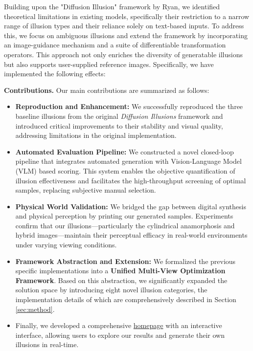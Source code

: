 \documentclass{article}
\begin{document}
Building upon the "Diffusion Illusion" framework by Ryan\cite{10.1145/3641519.3657500}, we identified theoretical limitations in existing models, specifically their restriction to a narrow range of illusion types and their reliance solely on text-based inputs. To address this, we focus on ambiguous illusions and extend the framework by incorporating an image-guidance mechanism and a suite of differentiable transformation operators. This approach not only enriches the diversity of generatable illusions but also supports user-supplied reference images. Specifically, we have implemented the following effects:

\textbf{Contributions.} Our main contributions are summarized as follows:

\begin{itemize}
    \item \textbf{Reproduction and Enhancement:} We successfully reproduced the three baseline illusions from the original \emph{Diffusion Illusions} framework and introduced critical improvements to their stability and visual quality, addressing limitations in the original implementation.
    
    \item \textbf{Automated Evaluation Pipeline:} We constructed a novel closed-loop pipeline that integrates automated generation with Vision-Language Model (VLM) based scoring. This system enables the objective quantification of illusion effectiveness and facilitates the high-throughput screening of optimal samples, replacing subjective manual selection.
    
    \item \textbf{Physical World Validation:} We bridged the gap between digital synthesis and physical perception by printing our generated samples. Experiments confirm that our illusions—particularly the cylindrical anamorphosis and hybrid images—maintain their perceptual efficacy in real-world environments under varying viewing conditions.
    
    \item \textbf{Framework Abstraction and Extension:} We formalized the previous specific implementations into a \textbf{Unified Multi-View Optimization Framework}. Based on this abstraction, we significantly expanded the solution space by introducing eight novel illusion categories, the implementation details of which are comprehensively described in Section \ref{sec:method}.

    \item  Finally, we developed a comprehensive \href{https://smallyang688.github.io/Creating-Visual-Cognitive-Illusions_homepage/}{homepage} with an interactive interface, allowing users to explore our results and generate their own illusions in real-time.
\end{itemize}
\end{document}
